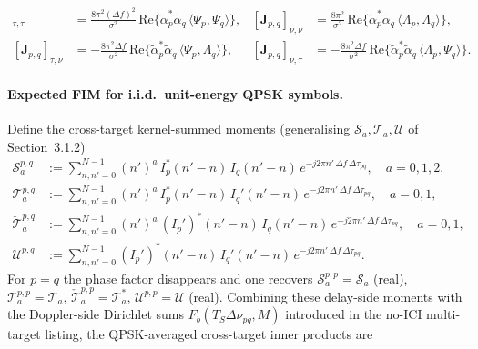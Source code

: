 \documentclass[11pt]{article}
\begin{document}
\begin{align}
    [\bm{J}_{p,q}]_{\tau,\tau} &=
        \tfrac{8\pi^2 (\Delta f)^2}{\sigma^2}\,
        \text{Re}\{\tilde{\alpha}_p^*\tilde{\alpha}_q\,\langle \Psi_p,\Psi_q\rangle\}, &
    [\bm{J}_{p,q}]_{\nu,\nu} &=
        \tfrac{8\pi^2}{\sigma^2}\,
        \text{Re}\{\tilde{\alpha}_p^*\tilde{\alpha}_q\,\langle \Lambda_p,\Lambda_q\rangle\}, \\
    [\bm{J}_{p,q}]_{\tau,\nu} &=
        -\tfrac{8\pi^2 \Delta f}{\sigma^2}\,
        \text{Re}\{\tilde{\alpha}_p^*\tilde{\alpha}_q\,\langle \Psi_p,\Lambda_q\rangle\}, &
    [\bm{J}_{p,q}]_{\nu,\tau} &=
        -\tfrac{8\pi^2 \Delta f}{\sigma^2}\,
        \text{Re}\{\tilde{\alpha}_p^*\tilde{\alpha}_q\,\langle \Lambda_p,\Psi_q\rangle\}.
\end{align}

\paragraph{Expected FIM for i.i.d.\ unit-energy QPSK symbols.} Define
the cross-target kernel-summed moments (generalising
\(\mathcal{S}_a,\mathcal{T}_a,\mathcal{U}\) of Section~3.1.2)
\begin{align}
    \mathcal{S}_a^{p,q}  &:= \sum_{n,n'=0}^{N-1} (n')^a\,
        I_p^*(n'-n)\, I_q(n'-n)\,
        e^{-j2\pi n'\,\Delta f\,\Delta\tau_{pq}}, \quad a=0,1,2, \\
    \mathcal{T}_a^{p,q}  &:= \sum_{n,n'=0}^{N-1} (n')^a\,
        I_p^*(n'-n)\, I_q'(n'-n)\,
        e^{-j2\pi n'\,\Delta f\,\Delta\tau_{pq}}, \quad a=0,1, \\
    \check{\mathcal{T}}_a^{p,q}  &:= \sum_{n,n'=0}^{N-1} (n')^a\,
        (I_p')^*(n'-n)\, I_q(n'-n)\,
        e^{-j2\pi n'\,\Delta f\,\Delta\tau_{pq}}, \quad a=0,1, \\
    \mathcal{U}^{p,q}    &:= \sum_{n,n'=0}^{N-1}
        (I_p')^*(n'-n)\, I_q'(n'-n)\,
        e^{-j2\pi n'\,\Delta f\,\Delta\tau_{pq}}.
\end{align}
For \(p=q\) the phase factor disappears and one recovers
\(\mathcal{S}_a^{p,p} = \mathcal{S}_a\) (real),
\(\mathcal{T}_a^{p,p} = \mathcal{T}_a\),
\(\check{\mathcal{T}}_a^{p,p} = \mathcal{T}_a^*\),
\(\mathcal{U}^{p,p} = \mathcal{U}\) (real). Combining these delay-side
moments with the Doppler-side Dirichlet sums
\(F_b(T_S\Delta\nu_{pq},M)\) introduced in the no-ICI multi-target
listing, the QPSK-averaged cross-target inner products are
\end{document}
